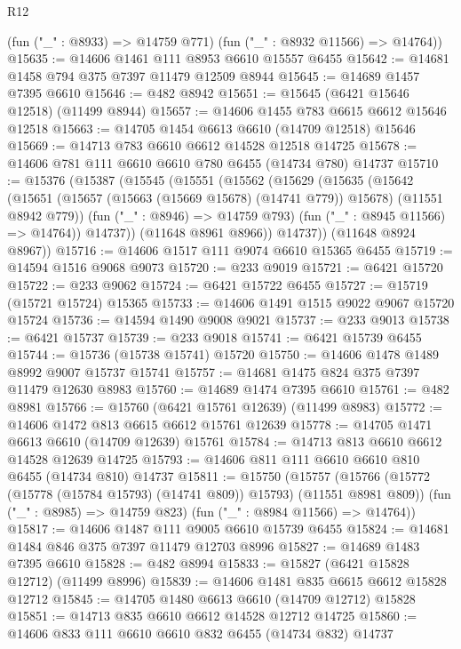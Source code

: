 \begin{lexlean}{R12}
\begin{coremodule}
      (fun ("_" : @8933) => @14759 @771)
      (fun ("_" : @8932 @11566) => @14764))
@15635 := @14606 @1461 @111 @8953 @6610 @15557 @6455
@15642 := @14681 @1458 @794 @375 @7397 @11479 @12509 @8944
@15645 := @14689 @1457 @7395 @6610
@15646 := @482 @8942
@15651 := @15645 (@6421 @15646 @12518) (@11499 @8944)
@15657 := @14606 @1455 @783 @6615 @6612 @15646 @12518
@15663 := @14705 @1454 @6613 @6610 (@14709 @12518) @15646
@15669 := @14713 @783 @6610 @6612 @14528 @12518 @14725
@15678 := @14606 @781 @111 @6610 @6610 @780 @6455 (@14734 @780) @14737
@15710 := @15376
    (@15387
      (@15545
        (@15551
          (@15562
            (@15629
              (@15635
                (@15642
                  (@15651
                    (@15657 (@15663 (@15669 @15678) (@14741 @779)) @15678)
                    (@11551 @8942 @779))
                  (fun ("_" : @8946) => @14759 @793)
                  (fun ("_" : @8945 @11566) => @14764))
                @14737))
            (@11648 @8961 @8966))
          @14737))
      (@11648 @8924 @8967))
@15716 := @14606 @1517 @111 @9074 @6610 @15365 @6455
@15719 := @14594 @1516 @9068 @9073
@15720 := @233 @9019
@15721 := @6421 @15720
@15722 := @233 @9062
@15724 := @6421 @15722 @6455
@15727 := @15719 (@15721 @15724) @15365
@15733 := @14606 @1491 @1515 @9022 @9067 @15720 @15724
@15736 := @14594 @1490 @9008 @9021
@15737 := @233 @9013
@15738 := @6421 @15737
@15739 := @233 @9018
@15741 := @6421 @15739 @6455
@15744 := @15736 (@15738 @15741) @15720
@15750 := @14606 @1478 @1489 @8992 @9007 @15737 @15741
@15757 := @14681 @1475 @824 @375 @7397 @11479 @12630 @8983
@15760 := @14689 @1474 @7395 @6610
@15761 := @482 @8981
@15766 := @15760 (@6421 @15761 @12639) (@11499 @8983)
@15772 := @14606 @1472 @813 @6615 @6612 @15761 @12639
@15778 := @14705 @1471 @6613 @6610 (@14709 @12639) @15761
@15784 := @14713 @813 @6610 @6612 @14528 @12639 @14725
@15793 := @14606 @811 @111 @6610 @6610 @810 @6455 (@14734 @810) @14737
@15811 := @15750
    (@15757
      (@15766 (@15772 (@15778 (@15784 @15793) (@14741 @809)) @15793) (@11551 @8981 @809))
      (fun ("_" : @8985) => @14759 @823)
      (fun ("_" : @8984 @11566) => @14764))
@15817 := @14606 @1487 @111 @9005 @6610 @15739 @6455
@15824 := @14681 @1484 @846 @375 @7397 @11479 @12703 @8996
@15827 := @14689 @1483 @7395 @6610
@15828 := @482 @8994
@15833 := @15827 (@6421 @15828 @12712) (@11499 @8996)
@15839 := @14606 @1481 @835 @6615 @6612 @15828 @12712
@15845 := @14705 @1480 @6613 @6610 (@14709 @12712) @15828
@15851 := @14713 @835 @6610 @6612 @14528 @12712 @14725
@15860 := @14606 @833 @111 @6610 @6610 @832 @6455 (@14734 @832) @14737

\end{coremodule}
\end{lexlean}

